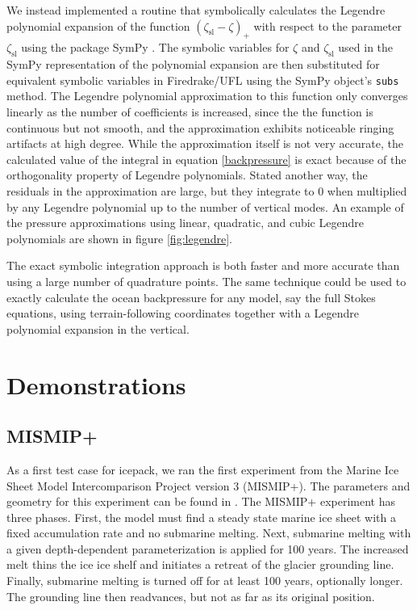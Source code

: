 \documentclass[journal abbreviation, manuscript]{copernicus}
\begin{document}
We instead implemented a routine that symbolically calculates the Legendre polynomial expansion of the function $(\zeta_{\text{sl}} - \zeta)_+$ with respect to the parameter $\zeta_{\text{sl}}$ using the package SymPy \citep{sympy}.
The symbolic variables for $\zeta$ and $\zeta_{\text{sl}}$ used in the SymPy representation of the polynomial expansion are then substituted for equivalent symbolic variables in Firedrake/UFL using the SymPy object's \texttt{subs} method.
The Legendre polynomial approximation to this function only converges linearly as the number of coefficients is increased, since the the function is continuous but not smooth, and the approximation exhibits noticeable ringing artifacts at high degree.
While the approximation itself is not very accurate, the calculated value of the integral in equation \eqref{backpressure} is exact because of the orthogonality property of Legendre polynomials.
Stated another way, the residuals in the approximation are large, but they integrate to 0 when multiplied by any Legendre polynomial up to the number of vertical modes.
An example of the pressure approximations using linear, quadratic, and cubic Legendre polynomials are shown in figure \ref{fig:legendre}.

The exact symbolic integration approach is both faster and more accurate than using a large number of quadrature points.
The same technique could be used to exactly calculate the ocean backpressure for any model, say the full Stokes equations, using terrain-following coordinates together with a Legendre polynomial expansion in the vertical.


\section{Demonstrations}

\subsection{MISMIP+}

As a first test case for icepack, we ran the first experiment from the Marine Ice Sheet Model Intercomparison Project version 3 (MISMIP+).
The parameters and geometry for this experiment can be found in \citet{asay2016experimental}.
The MISMIP+ experiment has three phases.
First, the model must find a steady state marine ice sheet with a fixed accumulation rate and no submarine melting.
Next, submarine melting with a given depth-dependent parameterization is applied for 100 years.
The increased melt thins the ice ice shelf and initiates a retreat of the glacier grounding line.
Finally, submarine melting is turned off for at least 100 years, optionally longer.
The grounding line then readvances, but not as far as its original position.
\end{document}

